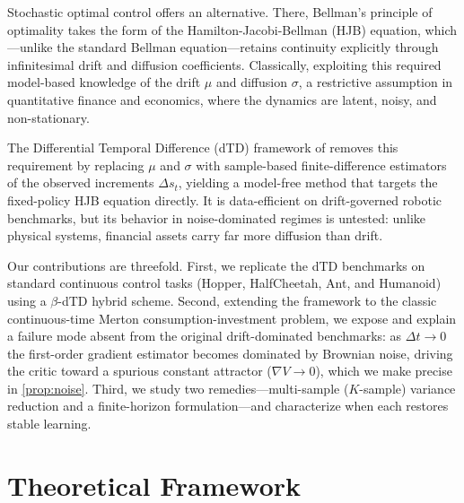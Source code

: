 \documentclass{article}
\begin{document}
Stochastic optimal control offers an alternative. There, Bellman's principle of optimality takes the form of the Hamilton-Jacobi-Bellman (HJB) equation, which---unlike the standard Bellman equation---retains continuity explicitly through infinitesimal drift and diffusion coefficients. Classically, exploiting this required model-based knowledge of the drift $\mu$ and diffusion $\sigma$, a restrictive assumption in quantitative finance and economics, where the dynamics are latent, noisy, and non-stationary.

The Differential Temporal Difference (dTD) framework of \citet{settai2025} removes this requirement by replacing $\mu$ and $\sigma$ with sample-based finite-difference estimators of the observed increments $\Delta s_t$, yielding a model-free method that targets the fixed-policy HJB equation directly. It is data-efficient on drift-governed robotic benchmarks, but its behavior in noise-dominated regimes is untested: unlike physical systems, financial assets carry far more diffusion than drift.

Our contributions are threefold. First, we replicate the dTD benchmarks on standard continuous control tasks (Hopper, HalfCheetah, Ant, and Humanoid) using a $\beta$-dTD hybrid scheme. Second, extending the framework to the classic continuous-time Merton consumption-investment problem, we expose and explain a failure mode absent from the original drift-dominated benchmarks: as $\Delta t \to 0$ the first-order gradient estimator becomes dominated by Brownian noise, driving the critic toward a spurious constant attractor ($\nabla V \to 0$), which we make precise in \cref{prop:noise}. Third, we study two remedies---multi-sample ($K$-sample) variance reduction and a finite-horizon formulation---and characterize when each restores stable learning.

\section{Theoretical Framework}
\label{sec:theoretical_framework}
\end{document}
